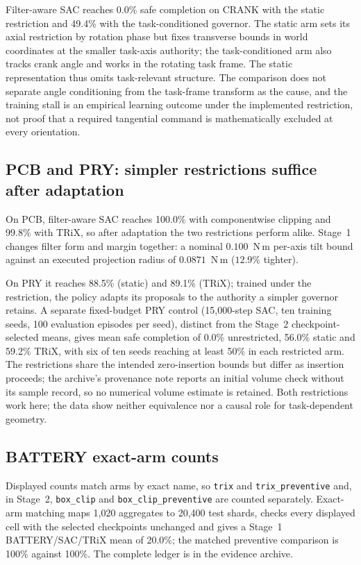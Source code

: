 \documentclass[10pt]{article}
\begin{document}
Filter-aware SAC reaches 0.0\% safe completion on CRANK with the static
restriction and 49.4\% with the task-conditioned governor.
The static arm sets its axial restriction by rotation phase but fixes
transverse bounds in world coordinates at the smaller task-axis authority;
the task-conditioned arm also tracks crank angle and works in the rotating
task frame. The static representation thus omits task-relevant structure. The comparison does not separate angle conditioning from the task-frame transform as the cause, and the training stall is an empirical learning outcome under the
implemented restriction, not proof that a required tangential command is
mathematically excluded at every orientation.


\subsection{PCB and PRY: simpler restrictions suffice after adaptation}

On PCB, filter-aware SAC reaches 100.0\% with componentwise clipping and
99.8\% with TRiX, so after adaptation the two restrictions perform alike.
Stage~1 changes filter form and margin together: a nominal $0.100$~N\,m
per-axis tilt bound against an executed projection radius of $0.0871$~N\,m
($12.9\%$ tighter).

On PRY it reaches 88.5\% (static) and 89.1\% (TRiX); trained under the
restriction, the policy adapts its proposals to the authority a simpler
governor retains. A separate fixed-budget PRY control (15,000-step SAC, ten
training seeds, 100 evaluation episodes per seed), distinct from the Stage~2
checkpoint-selected means, gives mean safe completion of 0.0\% unrestricted,
56.0\% static and 59.2\% TRiX, with six of ten seeds reaching at least 50\% in
each restricted arm. The restrictions share the intended zero-insertion
bounds but differ as insertion proceeds; the archive's provenance note reports
an initial volume check without its sample record, so no numerical volume
estimate is retained. Both restrictions work here; the data show neither equivalence nor a causal role for task-dependent geometry.



\subsection{BATTERY exact-arm counts}
Displayed counts match arms by exact name, so \texttt{trix} and
\texttt{trix\_preventive} and, in Stage~2, \texttt{box\_clip} and
\texttt{box\_clip\_preventive} are counted separately. Exact-arm matching maps 1,020 aggregates to 20,400 test shards, checks every displayed
cell with the selected checkpoints unchanged and gives a Stage~1
BATTERY/SAC/TRiX mean of 20.0\%; the matched preventive comparison is 100\%
against 100\%. The complete ledger is in the evidence archive.
\end{document}
